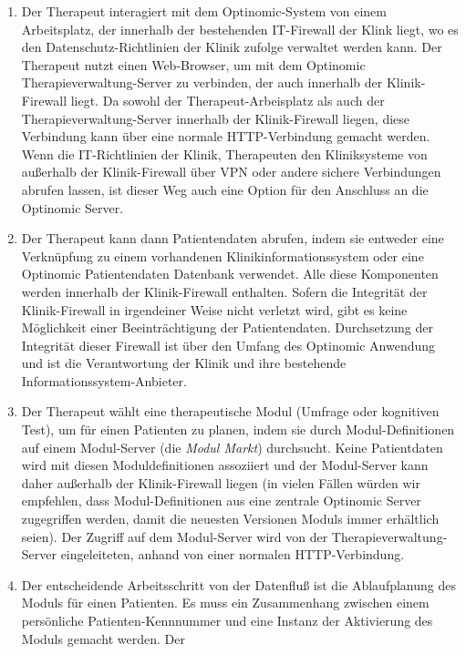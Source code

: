 \documentclass[DIV=calc,paper=a4,fontsize=11pt,twocolumn]{scrartcl}
\begin{document}
\begin{enumerate}
  \item{Der Therapeut interagiert mit dem Optinomic-System von einem
    Arbeitsplatz, der innerhalb der bestehenden IT-Firewall der Klink
    liegt, wo es den Datenschutz-Richtlinien der Klinik zufolge
    verwaltet werden kann. Der Therapeut nutzt einen Web-Browser, um
    mit dem Optinomic Therapieverwaltung-Server zu verbinden, der auch
    innerhalb der Klinik-Firewall liegt. Da sowohl der
    Therapeut-Arbeisplatz als auch der Therapieverwaltung-Server
    innerhalb der Klinik-Firewall liegen, diese Verbindung kann über
    eine normale HTTP-Verbindung gemacht werden. Wenn die
    IT-Richtlinien der Klinik, Therapeuten den Kliniksysteme von
    außerhalb der Klinik-Firewall über VPN oder andere sichere
    Verbindungen abrufen lassen, ist dieser Weg auch eine Option für
    den Anschluss an die Optinomic Server.}
  \item{Der Therapeut kann dann Patientendaten abrufen, indem sie
    entweder eine Verknüpfung zu einem vorhandenen
    Klinikinformationssystem oder eine Optinomic Patientendaten
    Datenbank verwendet. Alle diese Komponenten werden innerhalb der
    Klinik-Firewall enthalten. Sofern die Integrität der
    Klinik-Firewall in irgendeiner Weise nicht verletzt wird, gibt es
    keine Möglichkeit einer Beeinträchtigung der
    Patientendaten. Durchsetzung der Integrität dieser Firewall ist
    über den Umfang des Optinomic Anwendung und ist die Verantwortung
    der Klinik und ihre bestehende Informationssystem-Anbieter.}
  \item{Der Therapeut wählt eine therapeutische Modul (Umfrage oder
    kognitiven Test), um für einen Patienten zu planen, indem sie
    durch Modul-Definitionen auf einem Modul-Server (die \emph{Modul
      Markt}) durchsucht.  Keine Patientdaten wird mit diesen
    Moduldefinitionen assoziiert und der Modul-Server kann daher
    außerhalb der Klinik-Firewall liegen (in vielen Fällen würden wir
    empfehlen, dass Modul-Definitionen aus eine zentrale Optinomic
    Server zugegriffen werden, damit die neuesten Versionen Moduls
    immer erhältlich seien). Der Zugriff auf dem Modul-Server wird von
    der Therapieverwaltung-Server eingeleiteten, anhand von einer
    normalen HTTP-Verbindung.}
  \item{Der entscheidende Arbeitsschritt von der Datenfluß ist die
    Ablaufplanung des Moduls für einen Patienten. Es muss ein
    Zusammenhang zwischen einem persönliche Patienten-Kennnummer und
    eine Instanz der Aktivierung des Moduls gemacht werden. Der
}
\end{enumerate}
\end{document}
